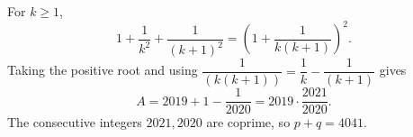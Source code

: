For $k\ge1$,
\[
1+\dfrac{1}{k^2}+\dfrac{1}{(k+1)^2}
=\left(1+\dfrac{1}{k(k+1)}\right)^2.
\]
Taking the positive root and using $\dfrac{1}{(k(k+1))}=\dfrac{1}{k}-\dfrac{1}{(k+1)}$ gives
\[
A=2019+1-\dfrac{1}{2020}
=2019\cdot\dfrac{2021}{2020}.
\]
The consecutive integers $2021,2020$ are coprime, so $\boxed{p+q=4041}$.
